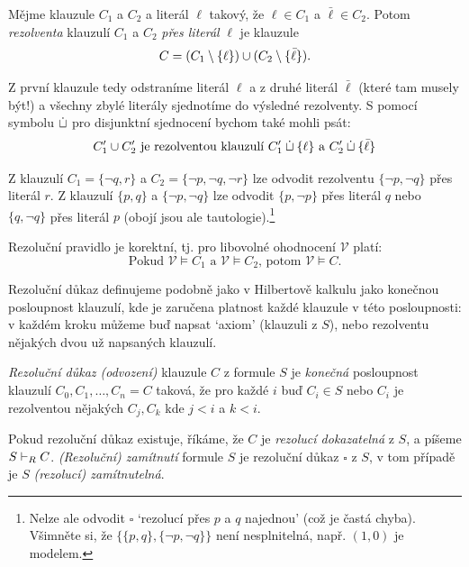 \begin{definition}
    Mějme klauzule $C_1$ a $C_2$ a literál $\ell$ takový, že $\ell\in C_1$ a $\bar\ell\in C_2$. Potom \emph{rezolventa} klauzulí $C_1$ a $C_2$ \emph{přes literál} $\ell$ je klauzule
    $$
    C=(C_1\setminus\{\ell\})\mathbin{\cup} (C_2\setminus\{\bar\ell\}).
    $$
\end{definition}

Z první klauzule tedy odstraníme literál $\ell$ a z druhé literál $\bar\ell$ (které tam musely být!) a všechny zbylé literály sjednotíme do výsledné rezolventy. S pomocí symbolu $\mathbin{\dot{\sqcup}}$ pro disjunktní sjednocení bychom také mohli psát:
$$
C_1'\mathbin{\cup} C_2'\text{ je rezolventou klauzulí }C_1'\mathbin{\dot{\sqcup}}\{\ell\}\text{ a }C_2'\mathbin{\dot{\sqcup}}\{\bar \ell\}
$$

\begin{example}
    Z klauzulí $C_1=\{\neg q,r\}$ a $C_2=\{\neg p,\neg q,\neg r\}$ lze odvodit rezolventu  $\{\neg p,\neg q\}$ přes literál $r$. Z klauzulí $\{p,q\}$ a $\{\neg p,\neg q\}$ lze odvodit $\{p,\neg p\}$ přes literál $q$ nebo $\{q,\neg q\}$ přes literál $p$ (obojí jsou ale tautologie).\footnote{Nelze ale odvodit $\square$ `rezolucí přes $p$ a $q$ najednou' (což je častá chyba). Všimněte si, že $\{\{p,q\},\{\neg p,\neg q\}\}$ není nesplnitelná, např. $(1,0)$ je modelem.}
\end{example}

\begin{observation}
Rezoluční pravidlo je korektní, tj. pro libovolné ohodnocení $\mathcal V$ platí:
$$
\text{Pokud }\mathcal V\models C_1\text{ a }\mathcal V\models C_2\text{, potom }\mathcal V\models C.
$$
\end{observation}

Rezoluční důkaz definujeme podobně jako v Hilbertově kalkulu jako konečnou posloupnost klauzulí, kde je zaručena platnost každé klauzule v této posloupnosti: v každém kroku můžeme buď napsat `axiom' (klauzuli z $S$), nebo rezolventu nějakých dvou už napsaných klauzulí.

\begin{definition}
    \emph{Rezoluční důkaz (odvození)} klauzule $C$ z formule $S$ je \emph{konečná} posloupnost klauzulí $C_0,C_1,\dots,C_n=C$
    taková, že pro každé $i$ buď $C_i\in S$ nebo $C_i$ je rezolventou nějakých $C_j,C_k$ kde $j<i$ a $k<i$.

    Pokud rezoluční důkaz existuje, říkáme, že $C$ je \emph{rezolucí dokazatelná} z $S$, a píšeme $S\vdash_R C$. \emph{(Rezoluční) zamítnutí} formule $S$ je rezoluční důkaz $\square$ z $S$, v tom případě je $S$ \emph{(rezolucí) zamítnutelná}.
\end{definition}

